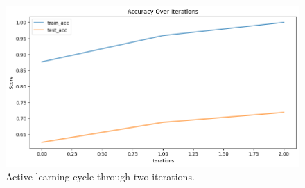\begin{figure}[H]
    \includegraphics[width=\linewidth]{figs/active_learning.png}
    \caption{Active learning cycle through two iterations.}
    \label{fig:c4:active_learning}
  \end{figure}